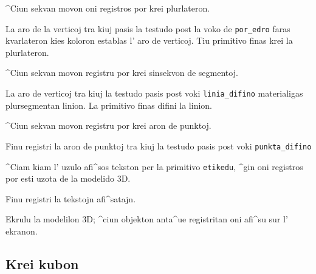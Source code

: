
^Ciun sekvan movon oni registros por krei plurlateron.


La aro de la verticoj tra kiuj pasis la testudo post la voko de
\texttt{por\_edro} faras kvarlateron kies koloron establas l' aro de
verticoj.  Tiu primitivo finas krei la plurlateron.


^Ciun sekvan movon registru por krei sinsekvon de segmentoj.


La aro de verticoj tra kiuj la testudo pasis post voki
\texttt{linia\_difino} materialigas plursegmentan linion.  La
primitivo finas difini la linion.


^Ciun sekvan movon registru por krei aron de punktoj.


Finu registri la aron de punktoj tra kiuj la testudo pasis post voki  \texttt{punkta\_difino}


^Ciam kiam l' uzulo afi^sos tekston per la primitivo \texttt{etikedu},
^gin oni registros por esti uzota de la modelido 3D.


Finu registri la tekstojn afi^satajn.


Ekrulu la modelilon 3D; ^ciun objekton anta^ue registritan oni afi^su sur l' ekranon.

\subsection{Krei kubon}

